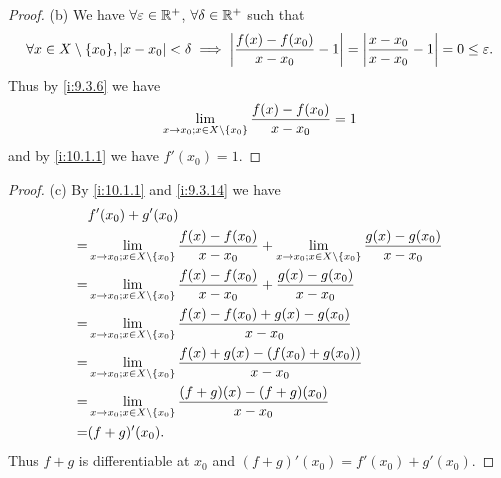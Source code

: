 \begin{proof}{(b)}
  We have \(\forall \varepsilon \in \mathbb{R}^+\), \(\forall \delta \in \mathbb{R}^+\) such that
  \[
    \forall x \in X \setminus \set{x_0}, \abs{x - x_0} < \delta \implies \abs{\dfrac{f(x) - f(x_0)}{x - x_0} - 1} = \abs{\dfrac{x - x_0}{x - x_0} - 1} = 0 \leq \varepsilon.
  \]
  Thus by \cref{i:9.3.6} we have
  \[
    \lim_{x \to x_0 ; x \in X \setminus \left\lbrace x_0\right\rbrace} \dfrac{f(x) - f(x_0)}{x - x_0} = 1
  \]
  and by \cref{i:10.1.1} we have \(f'(x_0) = 1\).
\end{proof}

\begin{proof}{(c)}
  By \cref{i:10.1.1} and \cref{i:9.3.14} we have
  \begin{align*}
      & f'(x_0) + g'(x_0)                                                                                                                                             \\
    = & \lim_{x \to x_0 ; x \in X \setminus \left\lbrace x_0\right\rbrace} \dfrac{f(x) - f(x_0)}{x - x_0} + \lim_{x \to x_0 ; x \in X \setminus \left\lbrace x_0\right\rbrace} \dfrac{g(x) - g(x_0)}{x - x_0} \\
    = & \lim_{x \to x_0 ; x \in X \setminus \left\lbrace x_0\right\rbrace} \dfrac{f(x) - f(x_0)}{x - x_0} + \dfrac{g(x) - g(x_0)}{x - x_0}                                                \\
    = & \lim_{x \to x_0 ; x \in X \setminus \left\lbrace x_0\right\rbrace} \dfrac{f(x) - f(x_0) + g(x) - g(x_0)}{x - x_0}                                                                 \\
    = & \lim_{x \to x_0 ; x \in X \setminus \left\lbrace x_0\right\rbrace} \dfrac{f(x) + g(x) - (f(x_0) + g(x_0))}{x - x_0}                                                               \\
    = & \lim_{x \to x_0 ; x \in X \setminus \left\lbrace x_0\right\rbrace} \dfrac{(f + g)(x) - (f + g)(x_0)}{x - x_0}                                                                     \\
    = & (f + g)'(x_0).
  \end{align*}
  Thus \(f + g\) is differentiable at \(x_0\) and \((f + g)'(x_0) = f'(x_0) + g'(x_0)\).
\end{proof}

